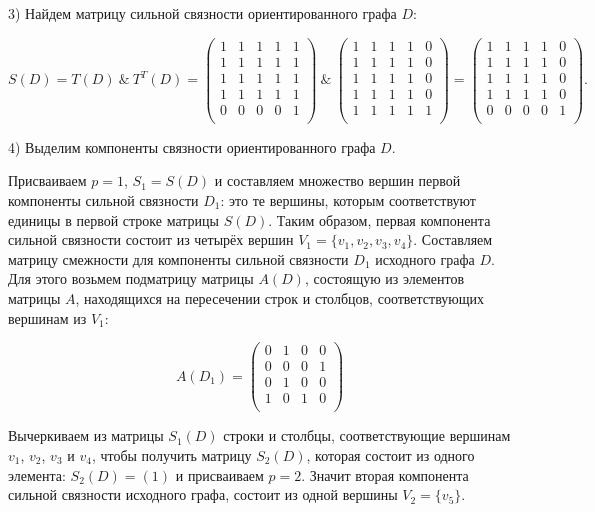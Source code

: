 \documentclass[fleqn]{article}
\begin{document}
3) Найдем матрицу сильной связности ориентированного графа $D$:

$$S(D)= T(D) \:\&\: T^T(D)=
\begin{pmatrix}
1 & 1 & 1 & 1 & 1\\
1 & 1 & 1 & 1 & 1\\
1 & 1 & 1 & 1 & 1\\
1 & 1 & 1 & 1 & 1\\
0 & 0 & 0 & 0 & 1\\
\end{pmatrix}
\:\&\:
\begin{pmatrix}
1 & 1 & 1 & 1 & 0\\
1 & 1 & 1 & 1 & 0\\
1 & 1 & 1 & 1 & 0\\
1 & 1 & 1 & 1 & 0\\
1 & 1 & 1 & 1 & 1\\
\end{pmatrix}
=\begin{pmatrix}
1 & 1 & 1 & 1 & 0\\
1 & 1 & 1 & 1 & 0\\
1 & 1 & 1 & 1 & 0\\
1 & 1 & 1 & 1 & 0\\
0 & 0 & 0 & 0 & 1\\
\end{pmatrix}.
$$

4) Выделим компоненты связности ориентированного графа $D$.

Присваиваем $p=1$, $S_1 = S(D)$ и составляем множество вершин
первой компоненты сильной связности $D_1$: это те вершины, которым соответствуют единицы в первой строке матрицы $S(D)$. Таким образом, первая компонента сильной связности состоит из четырёх вершин $V_1=\{v_1, v_2, v_3, v_4\}$. Составляем матрицу смежности для компоненты сильной связности $D_1$ исходного графа $D$. Для этого возьмем подматрицу матрицы $A(D)$, состоящую из элементов матрицы $A$, находящихся на пересечении строк и столбцов, соответствующих вершинам из $V_1$:

$$A(D_1)=
\begin{pmatrix}
0 & 1 & 0 & 0\\
0 & 0 & 0 & 1\\
0 & 1 & 0 & 0\\
1 & 0 & 1 & 0\\
\end{pmatrix}
$$

Вычеркиваем из матрицы $S_1(D)$ строки и столбцы,
соответствующие вершинам $v_1$, $v_2$, $v_3$ и $v_4$, чтобы получить матрицу $S_2(D)$, которая состоит из одного элемента: $S_2(D)=(1)$
и присваиваем $p=2$. Значит вторая компонента сильной связности исходного графа, состоит из одной вершины $V_2 = \{v_5\}$.
\end{document}
